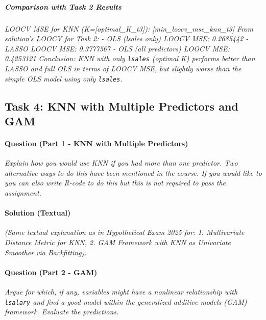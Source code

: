 \documentclass[12pt,a4paper]{article}
\newcommand{\Rcode}[1]{\texttt{#1}} %
\begin{document}
            \subparagraph{Comparison with Task 2 Results}
            \textit{
            LOOCV MSE for KNN (K=[optimal\_K\_t3]): [min\_loocv\_mse\_knn\_t3]
            From solution's LOOCV for Task 2:
            - OLS (lsales only) LOOCV MSE: 0.2685442
            - LASSO LOOCV MSE: 0.3777567
            - OLS (all predictors) LOOCV MSE: 0.4253121
            Conclusion: KNN with only \Rcode{lsales} (optimal K) performs better than LASSO and full OLS in terms of LOOCV MSE, but slightly worse than the simple OLS model using only \Rcode{lsales}.
            }

    \subsection{Task 4: KNN with Multiple Predictors and GAM}
        \paragraph{Question (Part 1 - KNN with Multiple Predictors)}
        \textit{Explain how you would use KNN if you had more than one predictor. Two alternative ways to do this have been mentioned in the course. If you would like to you can also write R-code to do this but this is not required to pass the assignment.}
        \paragraph{Solution (Textual)}
        \textit{(Same textual explanation as in Hypothetical Exam 2025 for: 1. Multivariate Distance Metric for KNN, 2. GAM Framework with KNN as Univariate Smoother via Backfitting).}

        \paragraph{Question (Part 2 - GAM)}
        \textit{Argue for which, if any, variables might have a nonlinear relationship with \Rcode{lsalary} and find a good model within the generalized additive models (GAM) framework. Evaluate the predictions.}
\end{document}
